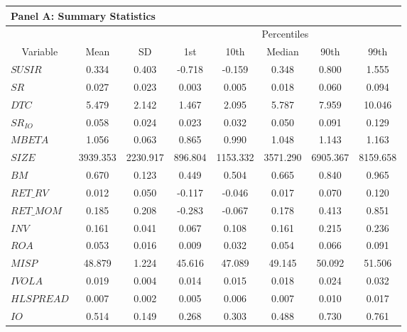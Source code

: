 \begin{tabular}{lccccccc}
\hline
\hline
\multicolumn{8}{l}{Panel A: Summary Statistics} \bigstrut\\
\hline
        &         &         & \multicolumn{5}{c}{Percentiles} \bigstrut\\
\cline{4-8}\multicolumn{1}{c}{Variable} & Mean    & SD      & 1st     & 10th    & Median  & 90th    & 99th \bigstrut\\
\hline
$SUSIR$ & 0.334   & 0.403   & -0.718  & -0.159  & 0.348   & 0.800   & 1.555 \bigstrut[t]\\
$SR$    & 0.027   & 0.023   & 0.003   & 0.005   & 0.018   & 0.060   & 0.094 \\
$DTC$   & 5.479   & 2.142   & 1.467   & 2.095   & 5.787   & 7.959   & 10.046 \\
$SR_{IO}$ & 0.058   & 0.024   & 0.023   & 0.032   & 0.050   & 0.091   & 0.129 \\
$MBETA$ & 1.056   & 0.063   & 0.865   & 0.990   & 1.048   & 1.143   & 1.163 \\
$SIZE$  & 3939.353 & 2230.917 & 896.804 & 1153.332 & 3571.290 & 6905.367 & 8159.658 \\
$BM$    & 0.670   & 0.123   & 0.449   & 0.504   & 0.665   & 0.840   & 0.965 \\
$RET\_RV$ & 0.012   & 0.050   & -0.117  & -0.046  & 0.017   & 0.070   & 0.120 \\
$RET\_MOM$ & 0.185   & 0.208   & -0.283  & -0.067  & 0.178   & 0.413   & 0.851 \\
$INV$   & 0.161   & 0.041   & 0.067   & 0.108   & 0.161   & 0.215   & 0.236 \\
$ROA$   & 0.053   & 0.016   & 0.009   & 0.032   & 0.054   & 0.066   & 0.091 \\
$MISP$  & 48.879  & 1.224   & 45.616  & 47.089  & 49.145  & 50.092  & 51.506 \\
$IVOLA$ & 0.019   & 0.004   & 0.014   & 0.015   & 0.018   & 0.024   & 0.032 \\
$HLSPREAD$ & 0.007   & 0.002   & 0.005   & 0.006   & 0.007   & 0.010   & 0.017 \\
$IO$    & 0.514   & 0.149   & 0.268   & 0.303   & 0.488   & 0.730   & 0.761 \bigstrut[b]\\
\hline
\end{tabular}%
